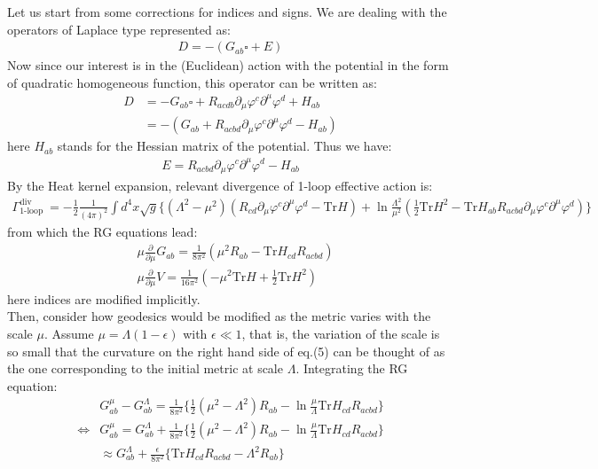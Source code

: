 \documentclass[fleqn]{article}
\begin{document}
Let us start from some corrections for indices and signs. We are dealing with the operators of Laplace type represented as:
\begin{align}
D = -(G_{ab} \square + E)
\end{align}
Now since our interest is in the (Euclidean) action with the potential in the form of quadratic homogeneous function, this operator can be written as:
\begin{align}
D &= -G_{ab}\square + R_{acdb} \partial _{\mu} \varphi ^{c} \partial ^{\mu} \varphi ^{d} + H_{ab} \nonumber \\
&= -(G_{ab} + R_{acbd}\partial _{\mu} \varphi ^{c} \partial ^{\mu} \varphi ^{d} - H_{ab} )
\end{align}
here $H_{ab}$ stands for the Hessian matrix of the potential. Thus we have:
\begin{align}
E = R_{acbd}\partial _{\mu} \varphi ^{c} \partial ^{\mu} \varphi ^{d} - H_{ab}
\end{align}
By the Heat kernel expansion, relevant divergence of 1-loop effective action is:
\begin{align}
\Gamma _{\text{1-loop}} ^{\text{div}} &= -\frac{1}{2} \frac{1}{(4\pi)^{2}}\int d^{4}x \sqrt{g} \lbrace (\Lambda ^{2} - \mu ^{2} )(R_{cd}\partial _{\mu} \varphi ^{c} \partial ^{\mu} \varphi ^{d} - \text{Tr}H) + \ln \frac{\Lambda ^{2}}{\mu ^{2}}(\frac{1}{2} \text{Tr} H^{2} -
\text{Tr}H_{ab} R_{acbd} \partial _{\mu} \varphi ^{c} \partial ^{\mu} \varphi ^{d})  \rbrace 
\end{align}
from which the RG equations lead:
\begin{align}
& \mu \frac{\partial}{\partial \mu} G_{ab} = \frac{1}{8\pi ^{2}} (\mu ^{2} R_{ab} -\text{Tr}H_{cd} R_{acbd}) \\
& \mu \frac{\partial}{\partial \mu} V = \frac{1}{16\pi ^{2}} (-\mu ^{2} \text{Tr}H +\frac{1}{2} \text{Tr} H^{2} ) 
\end{align}
here indices are modified implicitly. \\
Then, consider how geodesics would be modified as the metric varies with the scale $\mu$. Assume $\mu = \Lambda (1-\epsilon)$ with $\epsilon \ll 1$, that is, the variation of the scale is so small that the curvature on the right hand side of eq.(5) can be thought of as the one corresponding to the initial metric at scale $\Lambda$. Integrating the RG equation:
\begin{align}
&G_{ab}^{\mu} - G_{ab} ^{\Lambda} = \frac{1}{8\pi ^{2}} \lbrace \frac{1}{2}  (\mu ^{2} - \Lambda ^{2}) R_{ab} - \ln\frac{\mu}{\Lambda}  \text{Tr}H_{cd} R_{acbd} \rbrace \\
\Leftrightarrow & G_{ab} ^{\mu} = G_{ab}^{\Lambda} + \frac{1}{8\pi ^{2}} \lbrace \frac{1}{2}  (\mu ^{2} - \Lambda ^{2}) R_{ab} - \ln\frac{\mu}{\Lambda}  \text{Tr}H_{cd} R_{acbd} \rbrace \nonumber \\
& \approx G_{ab} ^{\Lambda} + \frac{\epsilon}{8\pi ^{2}} \lbrace \text{Tr} H_{cd} R_{acbd} - \Lambda ^{2} R_{ab} \rbrace
\end{align}
\end{document}

